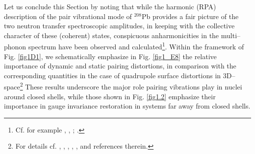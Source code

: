 Let us conclude this Section by noting that while the harmonic (RPA) description of the pair vibrational mode of $^{208}$Pb provides a fair picture of the two neutron transfer spectroscopic amplitudes, in keeping with the collective character of these (coherent) states, conspicuous anharmonicities in the multi--phonon spectrum have been observed and calculated\footnote{Cf. for example \cite{Flynn:72}, \cite{Lanford:73}, \cite{Bortignon:78}; \cite{Clark:06}.}. Within the framework of Fig. \ref{fig1D1}, we schematically emphasize in Fig. \ref{fig1_E8} the relative importance of dynamic and static pairing distortions, in comparison with the corresponding quantities in the case of quadrupole surface distortions in 3D--space\footnote{For details cf. \cite{Bes:77}, \cite{Broglia:68}, \cite{Bes:88},\cite{Barranco:87a} \cite{Shimizu:89}, \cite{Shimizu:13}, \cite{Vaquero:13} and references therein.}  These results underscore the major role pairing vibrations play in nuclei around closed shells, while those shown in Fig. \ref{fig1.2} emphasize their importance in gauge invariance restoration in systems far away from closed shells.
